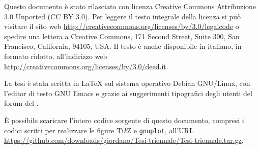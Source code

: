 \thispagestyle{empty}
\hfill
\vfill

Questo documento è stato rilasciato con licenza Creative Commons Attribuzione
3.0 Unported (CC BY 3.0). Per leggere il testo integrale della licenza si può
visitare il sito web \url{http://creativecommons.org/licenses/by/3.0/legalcode}
o spedire una lettera a Creative Commons, 171 Second Street, Suite 300, San
Francisco, California, 94105, USA. Il testo è anche disponibile in italiano, in
formato ridotto, all'indirizzo web
\url{http://creativecommons.org/licenses/by/3.0/deed.it}.

La tesi è stata scritta in \LaTeX{} sul sistema operativo Debian GNU/Linux, con
l'editor di testo GNU Emacs e grazie ai suggerimenti tipografici degli utenti
del forum del \GuIT.

È possibile scaricare l'intero codice sorgente di questo documento, compresi i
codici scritti per realizzare le figure Ti\emph{k}Z e \texttt{gnuplot}, all'URL
\url{https://github.com/downloads/giordano/Tesi-triennale/Tesi-triennale.tar.gz}.

